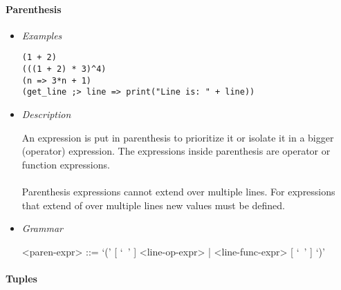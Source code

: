 \documentclass[diploma]{softlab-thesis}
\begin{document}
\paragraph{Parenthesis}

\begin{itemize}

\item \textit{Examples}
\begin{verbatim}
(1 + 2)
(((1 + 2) * 3)^4)
(n => 3*n + 1)
(get_line ;> line => print("Line is: " + line))
\end{verbatim}

\item \textit{Description}

An expression is put in parenthesis to prioritize it or isolate it in a bigger
(operator) expression. The expressions inside parenthesis are operator
or function expressions.
\\\\
Parenthesis expressions cannot extend over multiple lines. For expressions
that extend of over multiple lines new values must be defined.

\item \textit{Grammar}
\begin{grammar}
<paren-expr> ::= `(' [ `\ ' ] <line-op-expr> | <line-func-expr> [ `\ ' ] `)'
\end{grammar}

\end{itemize}

\paragraph{Tuples}
\end{document}
